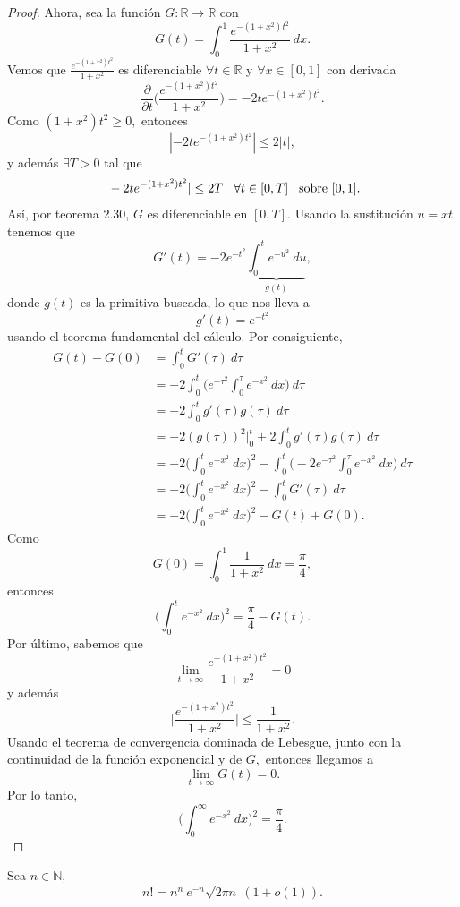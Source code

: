 \begin{proof}
	Ahora, sea la función $G: \mathbb{R} \rightarrow \mathbb{R}$ con $$G(t) = \int_{0}^{1}\frac{e^{-(1+x^2)t^2}}{1+x^2}\ dx.$$
	Vemos que $\frac{e^{-(1+x^2)t^2}}{1+x^2}$ es diferenciable $\forall t \in \mathbb{R}$ y $\forall x \in [0,1]$ con derivada $$\frac{\partial}{\partial t}\bigg(\frac{e^{-(1+x^2)t^2}}{1+x^2}\bigg) = -2te^{-(1+x^2)t^2}.$$
	Como $(1+x^2)t^2 \geq 0,$ entonces $$|-2te^{-(1+x^2)t^2}| \leq 2|t|,$$ y además $\exists T > 0$ tal que $$|-2te^{-(1+x^2)t^2}| \leq 2T\hspace{0.3cm}\forall t \in [0,T]\hspace{0.3cm}\textrm{sobre }[0,1].$$
	Así, por teorema 2.30, $G$ es diferenciable en $[0,T].$ Usando la sustitución $u = xt$ tenemos que $$G'(t) = -2e^{-t^2}\underbrace{\int_{0}^{t}e^{-u^2}\ du}_{g(t)},$$ donde $g(t)$ es la primitiva buscada, lo que nos lleva a $$g'(t) = e^{-t^2}$$ usando el teorema fundamental del cálculo. Por consiguiente,
	\begin{align*}
	G(t)-G(0) &= \int_{0}^{t}G'(\tau)\ d\tau\\
	&= -2\int_{0}^{t}\bigg(e^{-\tau^2}\int_{0}^{\tau}e^{-x^2}\ dx\bigg)\ d\tau\\
	&= -2\int_{0}^{t}g'(\tau)g(\tau)\ d\tau\\
	&= -2(g(\tau))^2\bigg|_0^t+2\int_{0}^{t}g'(\tau)g(\tau)\ d\tau\\
	&= -2\bigg(\int_{0}^{t}e^{-x^2}\ dx\bigg)^2-\int_{0}^{t}\bigg(-2e^{-\tau^2}\int_{0}^{\tau}e^{-x^2}\ dx\bigg)\ d\tau\\
	&= -2\bigg(\int_{0}^{t}e^{-x^2}\ dx\bigg)^2-\int_{0}^{t}G'(\tau)\ d\tau\\
	&= -2\bigg(\int_{0}^{t}e^{-x^2}\ dx\bigg)^2-G(t)+G(0).
	\end{align*}
	Como $$G(0) = \int_{0}^{1}\frac{1}{1+x^2}\ dx = \frac{\pi}{4},$$ entonces $$\bigg(\int_{0}^{t}e^{-x^2}\ dx\bigg)^2 = \frac{\pi}{4}-G(t).$$
	Por último, sabemos que $$\lim_{t \rightarrow \infty}\frac{e^{-(1+x^2)t^2}}{1+x^2} = 0$$ y además $$\bigg|\frac{e^{-(1+x^2)t^2}}{1+x^2}\bigg| \leq \frac{1}{1+x^2}.$$ Usando el teorema de convergencia dominada de Lebesgue, junto con la continuidad de la función exponencial y de $G,$ entonces llegamos a $$\lim_{t \rightarrow \infty}G(t) = 0.$$
	Por lo tanto, $$\bigg(\int_{0}^{\infty}e^{-x^2}\ dx\bigg)^2 = \frac{\pi}{4}.$$
\end{proof}
\begin{theorem}
	Sea $n \in \mathbb{N},$ $$n! = n^n\ e^{-n}\sqrt{2\pi n}\ (1+o(1)).$$
\end{theorem}
